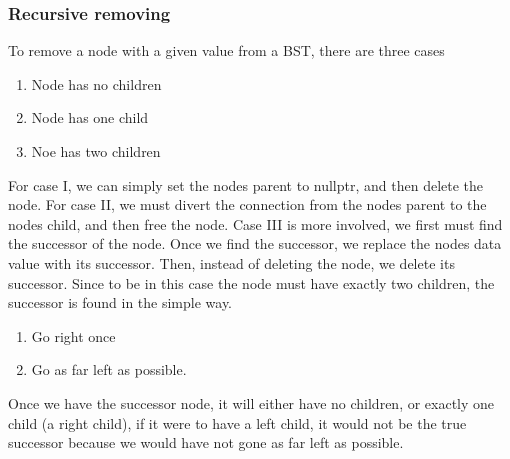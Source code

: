 \documentclass{report}
\begin{document}
\subsubsection{Recursive removing}
\bigbreak \noindent 
To remove a node with a given value from a BST, there are three cases
\begin{enumerate}
    \item Node has no children
    \item Node has one child
    \item Noe has two children
\end{enumerate}
For case I, we can simply set the nodes parent to nullptr, and then delete the node.
\bigbreak \noindent 
For case II, we must divert the connection from the nodes parent to the nodes child, and then free the node.
\bigbreak \noindent 
Case III is more involved, we first must find the successor of the node. Once we find the successor, we replace the nodes data value with its successor. Then, instead of deleting the node, we delete its successor. Since to be in this case the node must have exactly two children, the successor is found in the simple way.
\begin{enumerate}
    \item Go right once
    \item Go as far left as possible.
\end{enumerate}
Once we have the successor node, it will either have no children, or exactly one child (a right child), if it were to have a left child, it would not be the true successor because we would have not gone as far left as possible.
\pagebreak \bigbreak \noindent 
\end{document}
